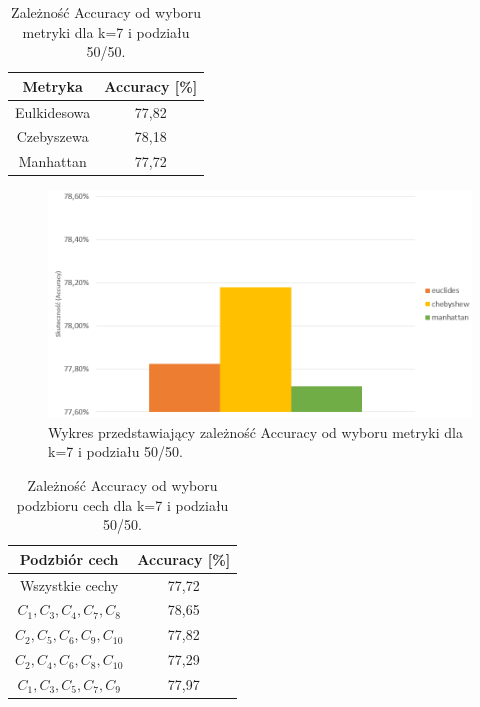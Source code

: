 \documentclass{classrep}
\begin{document}
\begin{table}[h!]
	\centering
	\begin{tabular} {c c}
		\hline
		\textbf{Metryka} & \textbf{Accuracy [\%]} \\ [0.5ex] 
		\hline
		\hline 
		Eulkidesowa & 77,82 \\ 
		Czebyszewa & 78,18 \\
		Manhattan &77,72 \\
		\hline
	\end{tabular}
	\caption{Zależność Accuracy od wyboru metryki dla k=7 i podziału 50/50. }
\end{table}

\begin{figure}[h!]
    \centering
    \includegraphics[width=1\textwidth]{metryki.png}
    \caption{Wykres przedstawiający zależność Accuracy od wyboru metryki dla k=7 i podziału 50/50.}
    \label{metryki}
\end{figure}
\begin{table}[h!]
	\centering
	\begin{tabular} {c c}
		\hline
		\textbf{Podzbiór cech} & \textbf{Accuracy [\%]} \\ [0.5ex] 
		\hline
		\hline 
		Wszystkie cechy & 77,72 \\ 
		$C_1, C_3, C_4, C_7, C_8$ & 78,65 \\
		$C_2, C_5, C_6, C_9, C_10$ & 77,82 \\
		$C_2, C_4, C_6, C_8, C_10$ & 77,29 \\
		$C_1, C_3, C_5, C_7, C_9$ & 77,97 \\
		\hline
	\end{tabular}
	\caption{Zależność Accuracy od wyboru podzbioru cech dla k=7 i podziału 50/50. }
\end{table}
\end{document}

